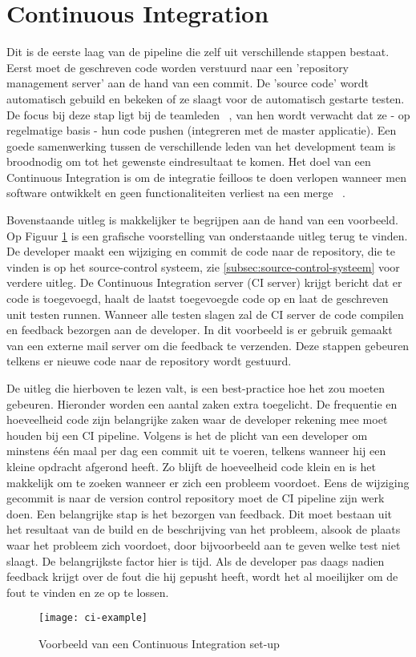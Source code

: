         \section{Continuous Integration}
        Dit is de eerste laag van de pipeline die zelf uit verschillende stappen bestaat. Eerst moet de geschreven code worden verstuurd naar een 'repository management server' aan de hand van een commit. De 'source code' wordt automatisch gebuild en bekeken of ze slaagt voor de automatisch gestarte testen. De focus bij deze stap ligt bij de teamleden ~\autocite{Fowler2006}, van hen wordt verwacht dat ze - op regelmatige basis - hun code pushen (integreren met de master applicatie). Een goede samenwerking tussen de verschillende leden van het development team is broodnodig om tot het gewenste eindresultaat te komen.
        Het doel van een Continuous Integration is om de integratie feilloos te doen verlopen wanneer men software ontwikkelt en geen functionaliteiten verliest na een merge ~\autocite{Riti2018}.
        
        Bovenstaande uitleg is makkelijker te begrijpen aan de hand van een voorbeeld. Op Figuur \ref{img-ci-example} is een grafische voorstelling van onderstaande uitleg terug te vinden.
        De developer maakt een wijziging en commit de code naar de repository, die te vinden is op het source-control systeem, zie \ref{subsec:source-control-systeem} voor verdere uitleg. De Continuous Integration server (CI server) krijgt bericht dat er code is toegevoegd, haalt de laatst toegevoegde code op en laat de geschreven unit testen runnen. Wanneer alle testen slagen zal de CI server de code compilen en feedback bezorgen aan de developer. In dit voorbeeld is er gebruik gemaakt van een externe mail server om die feedback te verzenden.
        Deze stappen gebeuren telkens er nieuwe code naar de repository wordt gestuurd.
        
        De uitleg die hierboven te lezen valt, is een best-practice hoe het zou moeten gebeuren. Hieronder worden een aantal zaken extra toegelicht.
        De frequentie en hoeveelheid code zijn belangrijke zaken waar de developer rekening mee moet houden bij een CI pipeline. Volgens \textcite{Fowler2006} is het de plicht van een developer om minstens één maal per dag een commit uit te voeren, telkens wanneer hij een kleine opdracht afgerond heeft. Zo blijft de hoeveelheid code klein en is het makkelijk om te zoeken wanneer er zich een probleem voordoet.
        Eens de wijziging gecommit is naar de version control repository moet de CI pipeline zijn werk doen. Een belangrijke stap is het bezorgen van feedback. Dit moet bestaan uit het resultaat van de build en de beschrijving van het probleem, alsook de plaats waar het probleem zich voordoet, door bijvoorbeeld aan te geven welke test niet slaagt. De belangrijkste factor hier is tijd. Als de developer pas daags nadien feedback krijgt over de fout die hij gepusht heeft, wordt het al moeilijker om de fout te vinden en ze op te lossen. 
        \begin{figure}	
            \texttt{[image: ci-example]}
            \caption{Voorbeeld van een Continuous Integration set-up ~\autocite{Riti2018}} \label{img-ci-example}
        \end{figure}
    
